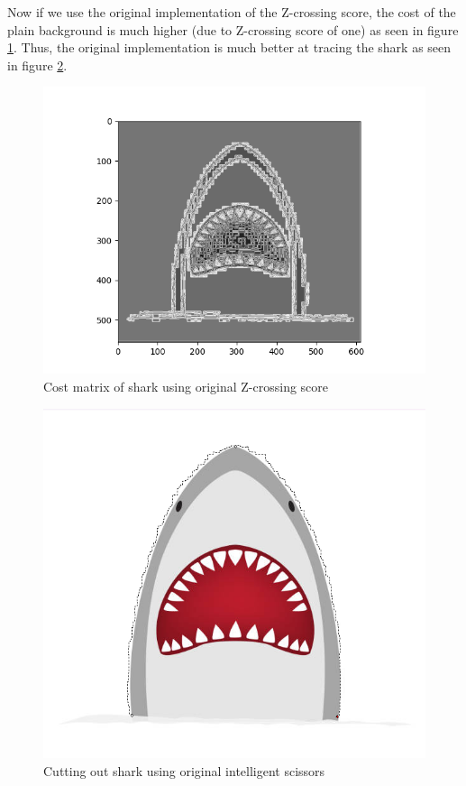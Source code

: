 \documentclass[11pt]{article}
\begin{document}
Now if we use the original implementation of the Z-crossing score, the cost of the plain background is much higher (due to Z-crossing score of one) as seen in figure \ref{fig:shark_cost_mod}. Thus, the original implementation is much better at tracing the shark as seen in figure \ref{fig:shark_cut_mod}.

\begin{figure}[H]
	\centering
	\includegraphics[scale = 0.5]{Cost_Shark_Original.png}
	\caption{\label{fig:shark_cost_mod}Cost matrix of shark using original Z-crossing score}
\end{figure}

\begin{figure}[H]
	\centering
	\includegraphics[scale = 0.5]{shark_cut.png}
	\caption{\label{fig:shark_cut_mod} Cutting out shark using original intelligent scissors}
\end{figure}
\end{document}
